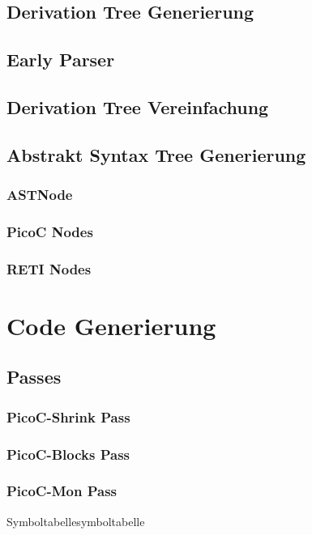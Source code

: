 \subsection{Derivation Tree Generierung}
\subsection{Early Parser}
\subsection{Derivation Tree Vereinfachung}
\subsection{Abstrakt Syntax Tree Generierung}
\subsubsection{ASTNode}
\subsubsection{PicoC Nodes}
\subsubsection{RETI Nodes}
\section{Code Generierung}
\subsection{Passes}
\subsubsection{PicoC-Shrink Pass}
\subsubsection{PicoC-Blocks Pass}
\subsubsection{PicoC-Mon Pass}
\begin{Definition}{Symboltabelle}{symboltabelle}
\end{Definition}
